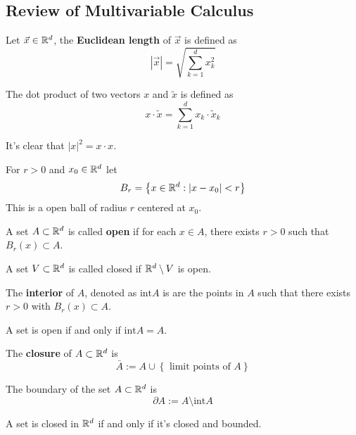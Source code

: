 \subsection{Review of Multivariable Calculus}
\begin{definition}
	Let $\vec x \in \mathbb R^d$, the \textbf{Euclidean length} of $\vec x$ is defined as
	\[ |\vec x| = \sqrt{\sum_{k=1}^{d} x_k^2}\]
\end{definition}
\begin{definition}
	The dot product of two vectors $x$ and $\tilde x$ is defined as
	\[ x \cdot \tilde x = \sum_{k=1}^{d} x_k \cdot \tilde x_k\]
\end{definition}
\begin{remark}
	It's clear that $|x|^2 = x \cdot x$.
\end{remark}
\begin{definition}
	For $r > 0$ and $x_0 \in \mathbb R^d$ let
	\[ B_r = \left\{ x \in \mathbb R^d : |x - x_0| < r \right\}\]
	This is a open ball of radius $r$ centered at $x_0$.
\end{definition}
\begin{definition}
	A set $A \subset \mathbb R^d$ is called \textbf{open} if for each $x \in A$, there exists $r > 0$ such that $B_r(x) \subset A$. 
\end{definition}
\begin{definition}
	A set $V \subset \mathbb R^d$ is called closed if $\mathbb R^d \setminus V$ is open. 
\end{definition}
\begin{definition}
	The \textbf{interior} of $A$, denoted as $\mathrm{int} A$ is are the points in $A$ such that there exists $r > 0$ with $B_r(x) \subset A$.
\end{definition}
\begin{theorem}
	A set is open if and only if $\mathrm{int} A = A$.
\end{theorem}
\begin{definition}
	The \textbf{closure} of $A \subset \mathbb R^d$ is
	\[ \bar A := A \cup \left\{ \text{ limit points of $A$} \right\}\]
\end{definition}
\begin{definition}
	The boundary of the set $A \subset \mathbb R^d$ is
	\[ \partial A := A \setminus \mathrm{int} A\]
\end{definition}
\begin{theorem}
	A set is closed in $\mathbb R^d$ if and only if it's closed and bounded.
\end{theorem}
